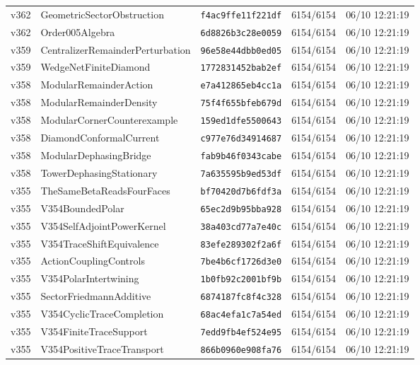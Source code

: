 \documentclass[11pt]{article}
\theoremstyle{definition}\newtheorem{deriv}{Derivation}
\begin{document}
{\begin{longtable}{@{}lllll@{}}
v362 & GeometricSectorObstruction & \texttt{f4ac9ffe11f221df} & 6154/6154 & 06/10 12:21:19 \\
v362 & Order005Algebra & \texttt{6d8826b3c28e0059} & 6154/6154 & 06/10 12:21:19 \\
v359 & CentralizerRemainderPerturbation & \texttt{96e58e44dbb0ed05} & 6154/6154 & 06/10 12:21:19 \\
v359 & WedgeNetFiniteDiamond & \texttt{1772831452bab2ef} & 6154/6154 & 06/10 12:21:19 \\
v358 & ModularRemainderAction & \texttt{e7a412865eb4cc1a} & 6154/6154 & 06/10 12:21:19 \\
v358 & ModularRemainderDensity & \texttt{75f4f655bfeb679d} & 6154/6154 & 06/10 12:21:19 \\
v358 & ModularCornerCounterexample & \texttt{159ed1dfe5500643} & 6154/6154 & 06/10 12:21:19 \\
v358 & DiamondConformalCurrent & \texttt{c977e76d34914687} & 6154/6154 & 06/10 12:21:19 \\
v358 & ModularDephasingBridge & \texttt{fab9b46f0343cabe} & 6154/6154 & 06/10 12:21:19 \\
v358 & TowerDephasingStationary & \texttt{7a635595b9ed53df} & 6154/6154 & 06/10 12:21:19 \\
v355 & TheSameBetaReadsFourFaces & \texttt{bf70420d7b6fdf3a} & 6154/6154 & 06/10 12:21:19 \\
v355 & V354BoundedPolar & \texttt{65ec2d9b95bba928} & 6154/6154 & 06/10 12:21:19 \\
v355 & V354SelfAdjointPowerKernel & \texttt{38a403cd77a7e40c} & 6154/6154 & 06/10 12:21:19 \\
v355 & V354TraceShiftEquivalence & \texttt{83efe289302f2a6f} & 6154/6154 & 06/10 12:21:19 \\
v355 & ActionCouplingControls & \texttt{7be4b6cf1726d3e0} & 6154/6154 & 06/10 12:21:19 \\
v355 & V354PolarIntertwining & \texttt{1b0fb92c2001bf9b} & 6154/6154 & 06/10 12:21:19 \\
v355 & SectorFriedmannAdditive & \texttt{6874187fc8f4c328} & 6154/6154 & 06/10 12:21:19 \\
v355 & V354CyclicTraceCompletion & \texttt{68ac4efa1c7a54ed} & 6154/6154 & 06/10 12:21:19 \\
v355 & V354FiniteTraceSupport & \texttt{7edd9fb4ef524e95} & 6154/6154 & 06/10 12:21:19 \\
v355 & V354PositiveTraceTransport & \texttt{866b0960e908fa76} & 6154/6154 & 06/10 12:21:19 \\

\end{longtable}}
\end{document}
